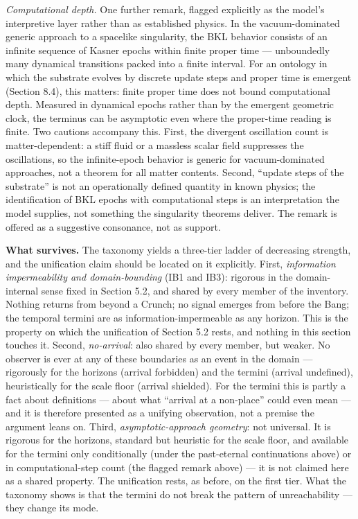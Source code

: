 \documentclass[
]{article}
\begin{document}
\emph{Computational depth.} One further remark, flagged explicitly as
the model's interpretive layer rather than as established physics. In
the vacuum-dominated generic approach to a spacelike singularity, the
BKL behavior consists of an infinite sequence of Kasner epochs within
finite proper time --- unboundedly many dynamical transitions packed
into a finite interval. For an ontology in which the substrate evolves
by discrete update steps and proper time is emergent (Section 8.4), this
matters: finite proper time does not bound computational depth. Measured
in dynamical epochs rather than by the emergent geometric clock, the
terminus can be asymptotic even where the proper-time reading is finite.
Two cautions accompany this. First, the divergent oscillation count is
matter-dependent: a stiff fluid or a massless scalar field suppresses
the oscillations, so the infinite-epoch behavior is generic for
vacuum-dominated approaches, not a theorem for all matter contents.
Second, ``update steps of the substrate'' is not an operationally
defined quantity in known physics; the identification of BKL epochs with
computational steps is an interpretation the model supplies, not
something the singularity theorems deliver. The remark is offered as a
suggestive consonance, not as support.

\textbf{What survives.} The taxonomy yields a three-tier ladder of
decreasing strength, and the unification claim should be located on it
explicitly. First, \emph{information impermeability and domain-bounding}
(IB1 and IB3): rigorous in the domain-internal sense fixed in Section
5.2, and shared by every member of the inventory. Nothing returns from
beyond a Crunch; no signal emerges from before the Bang; the temporal
termini are as information-impermeable as any horizon. This is the
property on which the unification of Section 5.2 rests, and nothing in
this section touches it. Second, \emph{no-arrival}: also shared by every
member, but weaker. No observer is ever at any of these boundaries as an
event in the domain --- rigorously for the horizons (arrival forbidden)
and the termini (arrival undefined), heuristically for the scale floor
(arrival shielded). For the termini this is partly a fact about
definitions --- about what ``arrival at a non-place'' could even mean
--- and it is therefore presented as a unifying observation, not a
premise the argument leans on. Third, \emph{asymptotic-approach
geometry}: not universal. It is rigorous for the horizons, standard but
heuristic for the scale floor, and available for the termini only
conditionally (under the past-eternal continuations above) or in
computational-step count (the flagged remark above) --- it is not
claimed here as a shared property. The unification rests, as before, on
the first tier. What the taxonomy shows is that the termini do not break
the pattern of unreachability --- they change its mode.
\end{document}
